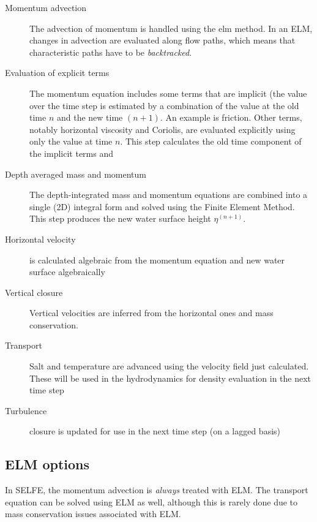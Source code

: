 \begin{description}
\item[Momentum advection] The advection of momentum is handled using the \gls{elm} method. In an ELM, changes in advection are evaluated along flow paths, which means that characteristic paths have to be {\em backtracked}. 
\item[Evaluation of explicit terms] The momentum equation includes some terms that are implicit (the value
over the time step is estimated by a combination of the value at the old time $n$ and the new time $(n+1)$.
An example is friction.
Other terms, notably horizontal viscosity and Coriolis, are 
evaluated explicitly using only the value at time $n$. This 
step calculates the old time component of the implicit terms and
\item[Depth averaged mass and momentum] The depth-integrated mass and momentum equations are combined into
a single (2D) integral form and solved using the Finite Element Method. This step produces the new water surface
height $\eta^{(n+1)}$. 
\item[Horizontal velocity] is calculated algebraic from the momentum equation and new water surface algebraically
\item[Vertical closure] Vertical velocities are inferred from the horizontal ones and mass conservation.
\item[Transport] Salt and temperature are advanced using the velocity field just calculated. These will be used
in the hydrodynamics for density evaluation in the next time step
\item[Turbulence] closure is updated for use in the next time step (on a lagged basis)
\end{description}



\subsection{ELM options}
In SELFE, the momentum advection is {\em always} treated with ELM. The transport equation can be solved using ELM as well, although this is rarely done due to mass conservation issues associated with ELM. 

